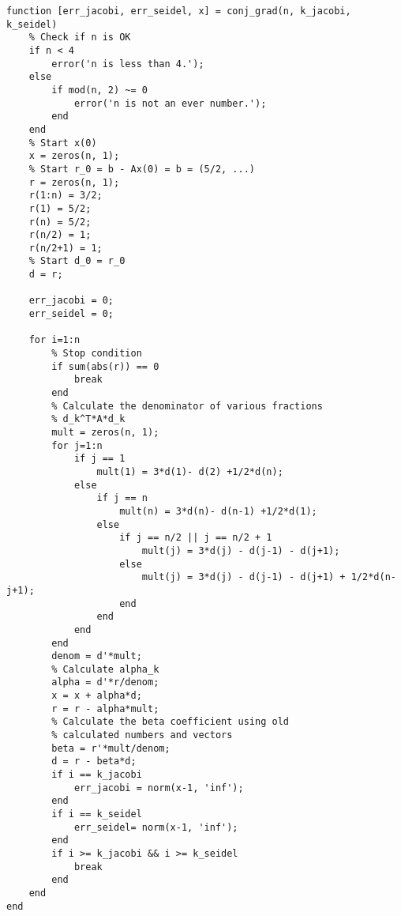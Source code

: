 \documentclass{article}
\begin{document}
        \begin{lstlisting}
function [err_jacobi, err_seidel, x] = conj_grad(n, k_jacobi, k_seidel)
    % Check if n is OK
    if n < 4
        error('n is less than 4.');
    else
        if mod(n, 2) ~= 0
            error('n is not an ever number.');
        end
    end
    % Start x(0)
    x = zeros(n, 1);
    % Start r_0 = b - Ax(0) = b = (5/2, ...)
    r = zeros(n, 1);
    r(1:n) = 3/2;
    r(1) = 5/2;
    r(n) = 5/2;
    r(n/2) = 1;
    r(n/2+1) = 1;
    % Start d_0 = r_0
    d = r;
    
    err_jacobi = 0;
    err_seidel = 0;
    
    for i=1:n
        % Stop condition
        if sum(abs(r)) == 0
            break
        end
        % Calculate the denominator of various fractions
        % d_k^T*A*d_k
        mult = zeros(n, 1);
        for j=1:n
            if j == 1
                mult(1) = 3*d(1)- d(2) +1/2*d(n);
            else
                if j == n
                    mult(n) = 3*d(n)- d(n-1) +1/2*d(1);                                        
                else
                    if j == n/2 || j == n/2 + 1
                        mult(j) = 3*d(j) - d(j-1) - d(j+1);
                    else
                        mult(j) = 3*d(j) - d(j-1) - d(j+1) + 1/2*d(n-j+1);
                    end
                end
            end
        end
        denom = d'*mult;
        % Calculate alpha_k
        alpha = d'*r/denom;
        x = x + alpha*d;
        r = r - alpha*mult;
        % Calculate the beta coefficient using old
        % calculated numbers and vectors
        beta = r'*mult/denom;
        d = r - beta*d;
        if i == k_jacobi
            err_jacobi = norm(x-1, 'inf');
        end
        if i == k_seidel
            err_seidel= norm(x-1, 'inf');
        end
        if i >= k_jacobi && i >= k_seidel
            break
        end
    end
end
        \end{lstlisting}
\end{document}
